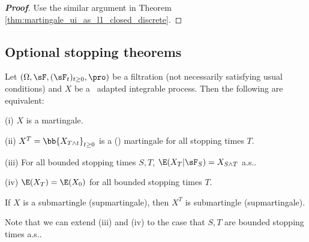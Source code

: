 \begin{proof}[\bf Proof]
Use the similar argument in Theorem \ref{thm:martingale_ui_as_l1_closed_discrete}.
\end{proof}

\subsection{Optional stopping theorems}

\begin{theorem}\label{thm:optional_stopping_bounded_stopping_time_continuous}
Let $(\Omega,\sF,(\sF_t)_{t\geq 0}, \pro)$ be a filtration (not necessarily satisfying usual conditions) and $X$ be a \cadlag\ adapted integrable process. Then the following are equivalent:
\ben
\item [(i)] $X$ is a martingale.
\item [(ii)] $X^T = \bb{X_{T\land t}}_{t\geq 0}$ is a (\cadlag) martingale for all stopping times $T$.%
\item [(iii)] For all bounded stopping times $S,T$, $\E(X_T|\sF_S) = X_{S\land T}$ a.s..
\item [(iv)] $\E(X_T) = \E(X_0)$ for all bounded stopping times $T$.
\een
\end{theorem}

\begin{remark}
If $X$ is a submartingle (supmartingale), then $X^T$ is submartingle (supmartingale).

Note that we can extend (iii) and (iv) to the case that $S,T$ are bounded stopping times a.s..
\end{remark}

